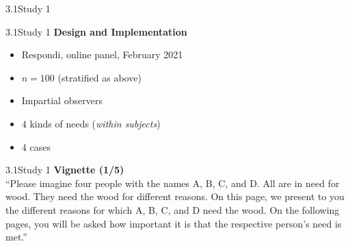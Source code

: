 \documentclass[xcolor=table,9pt,aspectratio=169]{beamer}
\begin{document}
\begin{frame}
\begin{overlayarea}{\textwidth}{0.81\paperheight}{
   \vspace*{11mm}
   \textcolor{uolblue}
   {3.1\hspace*{1em}Study 1}
}
\end{overlayarea}
\end{frame}


\begin{frame}{\vspace*{10mm}3.1\hspace*{1em}Study 1}
\textbf{Design and Implementation}\\
\medskip
\begin{itemize}
   \item Respondi, online panel, February 2021
   \item $n=100$ (stratified as above)
   \item Impartial observers
   \item $4$ kinds of needs (\textit{within subjects})
   \item $4$ cases
\end{itemize}
\end{frame}


\begin{frame}{\vspace*{10mm}3.1\hspace*{1em}Study 1}
\textbf{Vignette (1/5)}\\
\medskip
\enquote{Please imagine four people with the names A, B, C, and D.
All are in need for wood.
They need the wood for different reasons.
On this page, we present to you the different reasons for which A, B, C, and D need the wood.
On the following pages, you will be asked how important it is that the respective person's need is met.}
\end{frame}
\end{document}
